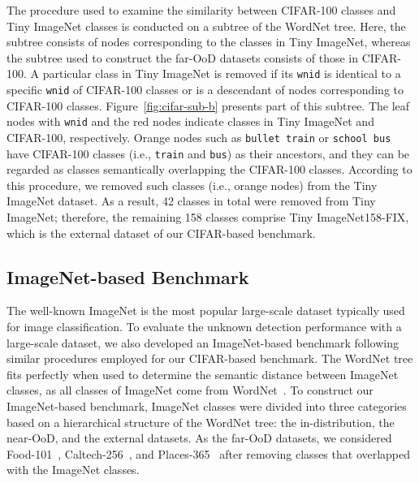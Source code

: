 \documentclass[preprint,12pt]{elsarticle}
\begin{document}
The procedure used to examine the similarity between CIFAR-100 classes and Tiny ImageNet classes is conducted on a subtree of the WordNet tree. Here, the subtree consists of nodes corresponding to the classes in Tiny ImageNet, whereas the subtree used to construct the far-OoD datasets consists of those in CIFAR-100. A particular class in Tiny ImageNet is removed if its \texttt{wnid} is identical to a specific \texttt{wnid} of CIFAR-100 classes or is a descendant of nodes corresponding to CIFAR-100 classes. Figure~\ref{fig:cifar-sub-b} presents part of this subtree. The leaf nodes with \texttt{wnid} and the red nodes indicate classes in Tiny ImageNet and CIFAR-100, respectively. Orange nodes such as \texttt{bullet train} or \texttt{school bus} have CIFAR-100 classes  (i.e., \texttt{train} and \texttt{bus}) as their ancestors, and they can be regarded as classes semantically overlapping the CIFAR-100 classes. According to this procedure, we removed such classes (i.e., orange nodes) from the Tiny ImageNet dataset. As a result, 42 classes in total were removed from Tiny ImageNet; therefore, the remaining 158 classes comprise Tiny ImageNet158-FIX, which is the external dataset of our CIFAR-based benchmark. 

\subsection{ImageNet-based Benchmark}
The well-known ImageNet is the most popular large-scale dataset typically used for image classification. 
To evaluate the unknown detection performance with a large-scale dataset, we also developed an ImageNet-based benchmark following similar procedures employed for our CIFAR-based benchmark. The WordNet tree fits perfectly when used to determine the semantic distance between ImageNet classes, as all classes of ImageNet come from WordNet~\citep{deng2009imagenet}. To construct our ImageNet-based benchmark, ImageNet classes were divided into three categories based on a hierarchical structure of the WordNet tree: the in-distribution, the near-OoD, and the external datasets. As the far-OoD datasets, we considered Food-101~\citep{bossard2014food}, Caltech-256~\citep{griffin2007caltech}, and Places-365~\citep{zhou2018places} after removing classes that overlapped with the ImageNet classes. 
\end{document}
